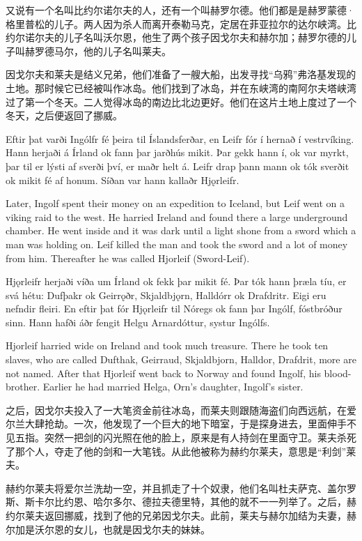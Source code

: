 \begin{translation*}{}
    又说有一个名叫比约尔诺尔夫的人，还有一个叫赫罗尔德。他们都是是赫罗蒙德·格里普松的儿子。两人因为杀人而离开泰勒马克，定居在菲亚拉尔的达尔峡湾。比约尔诺尔夫的儿子名叫沃尔恩，他生了两个孩子因戈尔夫和赫尔加；赫罗尔德的儿子叫赫罗德马尔，他的儿子名叫莱夫。

    因戈尔夫和莱夫是结义兄弟，他们准备了一艘大船，出发寻找“乌鸦”弗洛基发现的土地。那时候它已经被叫作冰岛。他们找到了冰岛，并在东峡湾的南阿尔夫塔峡湾过了第一个冬天。二人觉得冰岛的南边比北边更好。他们在这片土地上度过了一个冬天，之后便返回了挪威。
\end{translation*}


\begin{paracol}{2}
    Eftir þat varði Ingólfr fé þeira til Íslandsferðar, en Leifr fór í hernað í vestrvíking. Hann herjaði á Írland ok fann þar jarðhús mikit. Þar gekk hann í, ok var myrkt, þar til er lýsti af sverði því, er maðr helt á. Leifr drap þann mann ok tók sverðit ok mikit fé af honum. Síðan var hann kallaðr Hjǫrleifr.
    \switchcolumn

    Later, Ingolf spent their money on an expedition to Iceland, but Leif went on a viking raid to the west. He harried Ireland and found there a large underground chamber. He went inside and it was dark until a light shone from a sword which a man was holding on. Leif killed the man and took the sword and a lot of money from him. Thereafter he was called Hjorleif (Sword-Leif).

    \switchcolumn*

    Hjǫrleifr herjaði víða um Írland ok fekk þar mikit fé. Þar tók hann þræla tíu, er svá hétu: Dufþakr ok Geirrǫðr, Skjaldbjǫrn, Halldórr ok Drafdritr. Eigi eru nefndir fleiri. En eftir þat fór Hjǫrleifr til Nóregs ok fann þar Ingólf, fóstbróður sinn. Hann hafði áðr fengit Helgu Arnardóttur, systur Ingólfs.

    \switchcolumn

    Hjorleif harried wide on Ireland and took much treasure. There he took ten slaves, who are called Dufthak, Geirraud, Skjaldbjorn, Halldor, Drafdrit, more are not named. After that Hjorleif went back to Norway and found Ingolf, his blood-brother. Earlier he had married Helga, Orn's daughter, Ingolf's sister.
\end{paracol}
\begin{translation*}{}
    之后，因戈尔夫投入了一大笔资金前往冰岛，而莱夫则跟随海盗们向西远航，在爱尔兰大肆抢劫。一次，他发现了一个巨大的地下暗室，于是探身进去，里面伸手不见五指。突然一把剑的闪光照在他的脸上，原来是有人持剑在里面守卫。莱夫杀死了那个人，夺走了他的剑和一大笔钱。从此他被称为赫约尔莱夫，意思是“利剑”莱夫。

    赫约尔莱夫将爱尔兰洗劫一空，并且抓走了十个奴隶，他们名叫杜夫萨克、盖尔罗斯、斯卡尔比约恩、哈尔多尔、德拉夫德里特，其他的就不一一列举了。之后，赫约尔莱夫返回挪威，找到了他的兄弟因戈尔夫。此前，莱夫与赫尔加结为夫妻，赫尔加是沃尔恩的女儿，也就是因戈尔夫的妹妹。
\end{translation*}
